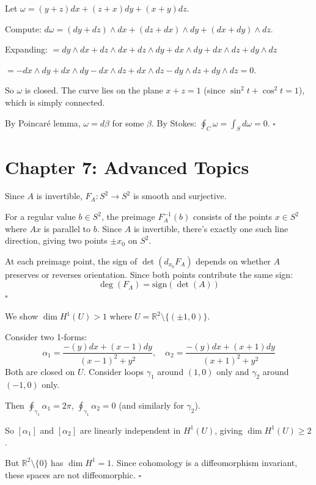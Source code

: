 \documentclass[11pt, letterpaper, openany]{book}
\newenvironment{solution}[1][Solution]{%
  \tcolorbox[blanker, breakable, left=1em,
    before skip=1em, after skip=1em,
    borderline west={2pt}{0pt}{MagicBlue},
    colback=MagicCream,
    before upper={\textcolor{MagicBlue}{\sffamily\bfseries #1.}\space}
  ]%
}{%
  \hfill\textcolor{MagicBlue}{\ensuremath{\square}}\endtcolorbox%
}
\begin{document}
\begin{solution}[6.5]
Let $\omega = (y+z)dx + (z+x)dy + (x+y)dz$.

Compute: $d\omega = (dy + dz) \wedge dx + (dz + dx) \wedge dy + (dx + dy) \wedge dz$.

Expanding: $= dy \wedge dx + dz \wedge dx + dz \wedge dy + dx \wedge dy + dx \wedge dz + dy \wedge dz$

$= -dx \wedge dy + dx \wedge dy - dx \wedge dz + dx \wedge dz - dy \wedge dz + dy \wedge dz = 0$.

So $\omega$ is closed. The curve lies on the plane $x + z = 1$ (since $\sin^2 t + \cos^2 t = 1$), which is simply connected.

By Poincaré lemma, $\omega = d\beta$ for some $\beta$. By Stokes: $\oint_C \omega = \int_S d\omega = 0$.
\end{solution}

\section*{Chapter 7: Advanced Topics}

\begin{solution}[Degree of $F_A$]
Since $A$ is invertible, $F_A: S^2 \to S^2$ is smooth and surjective.

For a regular value $b \in S^2$, the preimage $F_A^{-1}(b)$ consists of the points $x \in S^2$ where $Ax$ is parallel to $b$. Since $A$ is invertible, there's exactly one such line direction, giving two points $\pm x_0$ on $S^2$.

At each preimage point, the sign of $\det(d_{x_0} F_A)$ depends on whether $A$ preserves or reverses orientation. Since both points contribute the same sign:
\[
\deg(F_A) = \text{sign}(\det(A))
\]
\end{solution}

\begin{solution}[$\mathbb{R}^2$ minus two points]
We show $\dim H^1(U) > 1$ where $U = \mathbb{R}^2 \setminus \{(\pm 1, 0)\}$.

Consider two 1-forms:
\[
\alpha_1 = \frac{-(y)dx + (x-1)dy}{(x-1)^2 + y^2}, \quad \alpha_2 = \frac{-(y)dx + (x+1)dy}{(x+1)^2 + y^2}
\]
Both are closed on $U$. Consider loops $\gamma_1$ around $(1, 0)$ only and $\gamma_2$ around $(-1, 0)$ only.

Then $\oint_{\gamma_1} \alpha_1 = 2\pi$, $\oint_{\gamma_1} \alpha_2 = 0$ (and similarly for $\gamma_2$).

So $[\alpha_1]$ and $[\alpha_2]$ are linearly independent in $H^1(U)$, giving $\dim H^1(U) \geq 2$.

But $\mathbb{R}^2 \setminus \{0\}$ has $\dim H^1 = 1$. Since cohomology is a diffeomorphism invariant, these spaces are not diffeomorphic.
\end{solution}
\end{document}

